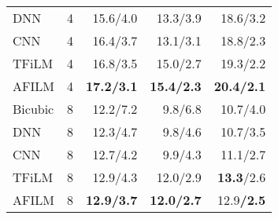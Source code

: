 \documentclass{article}
\begin{document}
\begin{table}[h]
\begin{tabular}{|l|r|r|r|r|}
    DNN \cite{li2015dnn}   & 4                          & 15.6/4.0                                                                     & 13.3/3.9                                                                    & 18.6/3.2                   \\
    CNN \cite{kuleshov2017audio}      & 4                          & 16.4/3.7                                                                     & 13.1/3.1                                                                    & 18.8/2.3                   \\
    TFiLM \cite{birnbaum2019temporal} & 4                          & 16.8/3.5                                                                     & 15.0/2.7                                                                    & 19.3/2.2                   \\
    AFILM   & 4                          & \textbf{17.2/3.1}                                                                          & \textbf{15.4/2.3}                                                                         & \textbf{20.4/2.1}                        \\ \hline
    Bicubic & 8                          & 12.2/7.2                                                                     & 9.8/6.8                                                                     & 10.7/4.0                   \\
    DNN \cite{li2015dnn}   & 8                          & 12.3/4.7                                                                     & 9.8/4.6                                                                     & 10.7/3.5                   \\
    CNN \cite{kuleshov2017audio}     & 8                          & 12.7/4.2                                                                     & 9.9/4.3                                                                     & 11.1/2.7                   \\
    TFiLM \cite{birnbaum2019temporal} & 8                          & 12.9/4.3                                                                     & 12.0/2.9                                                                    & \textbf{13.3}/2.6                   \\
    AFILM   & 8                          & \textbf{12.9/3.7}                                                                          & \textbf{12.0/2.7}                                                                         & 12.9\textbf{/2.5}                        \\ \hline
    \end{tabular}
\end{table}
\end{document}
